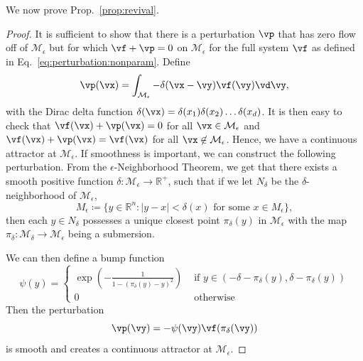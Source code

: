\documentclass{article} %
\newcounter{ct}
\newcommand{\reals}{\mathbb{R}}
\newcommand{\manifold}{\mathcal{M}}
\theoremstyle{definition}
\theoremstyle{remark}
\newtheorem{remark}{Remark}
\begin{document}
We now prove  Prop.~\ref{prop:revival}.
\begin{proof}%
It is sufficient to show that there is a perturbation \(\vp\) that has zero flow off of \(\manifold_{\epsilon}\) but for which \(\vf+\vp = 0\) on \(\manifold_{\epsilon}\) for the full system \(\vf\)  as defined in Eq.~\ref{eq:perturbation:nonparam}.
Define
\[\vp(\vx) = \int_{\manifold_{\epsilon}} - \delta(\vx-\vy)\vf(\vy)\vd\vy,\]
 with the Dirac delta function \(\delta(\vx)=\delta(x_{1})\delta(x_{2})\dots\delta(x_{d})\).
It is then easy to check that \(\vf(\vx)+\vp(\vx)=0\) for all \(\vx\in\manifold_{\epsilon}\) and \(\vf(\vx)+\vp(\vx)=\vf(\vx)\) for all \(\vx\not\in\manifold_{\epsilon}\).
Hence, we have a continuous attractor at \(\manifold_{\epsilon}\).
%
If smoothness is important, we can construct the following perturbation.
From the \(\epsilon\)-Neighborhood Theorem\citep{folland1999real}, we get that  there exists a smooth positive function \(\delta\colon \manifold_{\epsilon} \rightarrow \reals^+\),
 such that if we let \(N_{\delta}\) be the
\(\delta\)-neighborhood of \(\manifold_{\epsilon}\),
\[
M_{\epsilon}\coloneqq \{y  \in \reals^{n} : |y - x| < \delta(x) \text{ for some }  x \in M_{\epsilon}\},
\]
then each \(y\in N_{\delta}\) possesses a unique closest point \(\pi_{\delta}(y)\) in \(\manifold_{\epsilon}\) with the map \(\pi_{\delta}\colon \manifold_{\delta} \rightarrow \manifold_{\epsilon}\) being a submersion.

We can then define a bump function
\begin{equation}
\psi(y) =
\begin{cases}
\exp\left(-\frac{1}{1-(\pi_{\delta}(y)-y)^{2}}\right) &\text{  if  } y\in(-\delta-\pi_{\delta}(y), \delta-\pi_{\delta}(y))\\
0 & \text{  otherwise }
\end{cases}
\end{equation}
Then the perturbation
\[
\vp(\vy) = - \psi(\vy)\vf(\pi_{\delta}(\vy))
\]
is smooth and creates a continuous attractor at \(\manifold_{\epsilon}\).
\end{proof}
\end{document}
